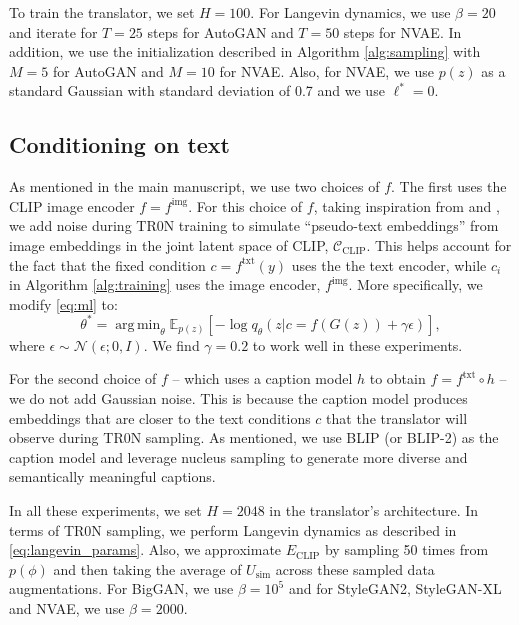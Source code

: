 \documentclass[nohyperref]{article}
\DeclareMathOperator*{\argmin}{arg\,min}
\theoremstyle{plain}
\theoremstyle{definition}
\theoremstyle{remark}
\begin{document}
To train the translator, we set $H=100$. For Langevin dynamics, we use $\beta=20$ and iterate for $T=25$ steps for AutoGAN and $T=50$ steps for NVAE. In addition, we use the initialization described in Algorithm \ref{alg:sampling} with $M=5$ for AutoGAN and $M=10$ for NVAE. Also, for NVAE, we use $p(z)$ as a standard Gaussian with standard deviation of 0.7 and we use $\ell^{*}=0$.

\subsection{Conditioning on text}

As mentioned in the main manuscript, we use two choices of $f$. The first uses the CLIP image encoder $f=f^\text{img}$. For this choice of $f$, taking inspiration from \citet{zhou2021lafite} and \citet{nukrai2022text}, we add noise during TR0N training to simulate ``pseudo-text embeddings'' from image embeddings in the joint latent space of CLIP, $\mathcal{C}_{\text{CLIP}}$. This helps account for the fact that the fixed condition $c=f^{\text{txt}}(y)$ uses the the text encoder, while $c_i$ in Algorithm \ref{alg:training} uses the image encoder, $f^{\text{img}}$. More specifically, we modify \eqref{eq:ml} to: 
\begin{equation}
    \theta^* = \argmin_\theta \mathbb{E}_{p(z)}\left[-\log q_\theta \left(z|c=f(G(z))+\gamma \epsilon \right)\right],
\end{equation}
where $\epsilon \sim \mathcal{N}(\epsilon; 0, I)$. We find $\gamma=0.2$ to work well in these experiments. 

For the second choice of $f$ -- which uses a caption model $h$ to obtain $f=f^\text{txt} \circ h$ -- we do not add Gaussian noise. This is because the caption model produces embeddings that are closer to the text conditions $c$ that the translator will observe during TR0N sampling. As mentioned, we use BLIP (or BLIP-2) as the caption model and leverage nucleus sampling \citep{holtzman2019curious} to generate more diverse and semantically meaningful captions. 

In all these experiments, we set $H=2048$ in the translator's architecture. In terms of TR0N sampling, we perform Langevin dynamics as described in \eqref{eq:langevin_params}. Also, we approximate $E_{\text{CLIP}}$ by sampling 50 times from $p(\phi)$ and then taking the average of $U_\text{sim}$ across these sampled data augmentations. For BigGAN, we use $\beta=10^5$ and for StyleGAN2, StyleGAN-XL and NVAE, we use $\beta=2000$.   
\end{document}
